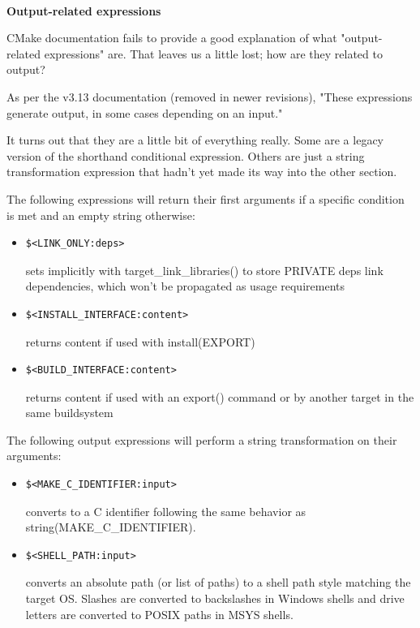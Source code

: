 \hspace*{\fill} \\ %
\noindent
\textbf{Output-related expressions}

CMake documentation fails to provide a good explanation of what "output-related expressions" are. That leaves us a little lost; how are they related to output?

As per the v3.13 documentation (removed in newer revisions), "These expressions generate output, in some cases depending on an input." 

It turns out that they are a little bit of everything really. Some are a legacy version of the shorthand conditional expression. Others are just a string transformation expression that hadn't yet made its way into the other section.

The following expressions will return their first arguments if a specific condition is met and an empty string otherwise:

\begin{itemize}
\item 
\begin{lstlisting}[style=styleCMake]
$<LINK_ONLY:deps>
\end{lstlisting}

sets implicitly with target\_link\_libraries() to store PRIVATE deps link dependencies, which won't be propagated as usage requirements

\item 
\begin{lstlisting}[style=styleCMake]
$<INSTALL_INTERFACE:content>
\end{lstlisting}

returns content if used with install(EXPORT)

\item 
\begin{lstlisting}[style=styleCMake]
$<BUILD_INTERFACE:content> 
\end{lstlisting}

returns content if used with an export() command or by another target in the same buildsystem
\end{itemize}

The following output expressions will perform a string transformation on their arguments:

\begin{itemize}
\item 
\begin{lstlisting}[style=styleCMake]
$<MAKE_C_IDENTIFIER:input> 
\end{lstlisting}

converts to a C identifier following the same behavior as string(MAKE\_C\_IDENTIFIER).

\item 
\begin{lstlisting}[style=styleCMake]
$<SHELL_PATH:input>
\end{lstlisting}

converts an absolute path (or list of paths) to a shell path style matching the target OS. Slashes are converted to backslashes in Windows shells and drive letters are converted to POSIX paths in MSYS shells.
\end{itemize}

